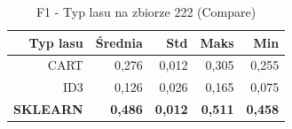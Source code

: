 \begin{table}[htbp]
\centering
\small
\setlength{\tabcolsep}{6pt}
\renewcommand{\arraystretch}{1.2}
\caption{F1 - Typ lasu na zbiorze 222 (Compare)}
\label{tab:Compare_on_222_f1}
\begin{tabular}{r|r|r|r|r}
\toprule
Typ lasu & Średnia & Std & Maks & Min \\
\hline
CART & 0,276 & 0,012 & 0,305 & 0,255 \\
ID3 & 0,126 & 0,026 & 0,165 & 0,075 \\
\textbf{SKLEARN} & \textbf{0,486} & \textbf{0,012} & \textbf{0,511} & \textbf{0,458} \\
\bottomrule
\end{tabular}
\end{table}